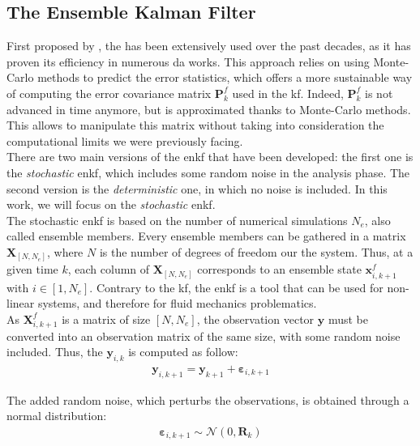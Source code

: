 \documentclass[12pt,twoside]{report}
\begin{document}
\subsection{The Ensemble Kalman Filter} \label{sec:EnKF}
First proposed by \cite{evensen_sequential_1994}, the  has been extensively used over the past decades, as it has proven its efficiency in numerous \gls{da} works. This approach relies on using Monte-Carlo methods to predict the error statistics, which offers a more sustainable way of computing the error covariance matrix $\mathbf{P}_k^f$ used in the \gls{kf}. Indeed, $\mathbf{P}_k^f$ is not advanced in time anymore, but is approximated thanks to Monte-Carlo methods. This allows to manipulate this matrix without taking into consideration the computational limits we were previously facing. \\

There are two main versions of the \gls{enkf} that have been developed: the first one is the \textsl{stochastic} \gls{enkf}, which includes some random noise in the analysis phase. The second version is the \textsl{deterministic} one, in which no noise is included. In this work, we will focus on the \textsl{stochastic} \gls{enkf}. \\

The stochastic \gls{enkf} is based on the number of numerical simulations $N_e$, also called ensemble members. Every ensemble members can be gathered in a matrix $\mathbf{X}_{ \left[ N, N_e \right]}$, where $N$ is the number of degrees of freedom our the system. Thus, at a given time $k$, each column of $\mathbf{X}_{ \left[ N, N_e \right]}$ corresponds to an ensemble state $\mathbf{x}_{i,k+1}^f$ with $i \in \left[ 1,N_e \right]$.  Contrary to the \gls{kf}, the \gls{enkf} is a tool that can be used for non-linear systems, and therefore for fluid mechanics problematics. \\

As $\mathbf{X}^f_{i,k+1}$ is a matrix of size $\left[ N, N_e \right]$, the observation vector $\mathbf{y}$ must be converted into an observation matrix of the same size, with some random noise included. Thus, the $\mathbf{y}_{i,k}$ is computed as follow:
\begin{align}
    \mathbf{y}_{i,k+1} = \mathbf{y}_{k+1} + \bm{\varepsilon}_{i,k+1}
\end{align}

The added random noise, which perturbs the observations, is obtained through a normal distribution:
\begin{align}
    \bm{\varepsilon}_{i,k+1} \sim \mathcal{N}\left( 0, \mathbf{R}_k \right) \label{eq:e_noise}
\end{align}
\end{document}
